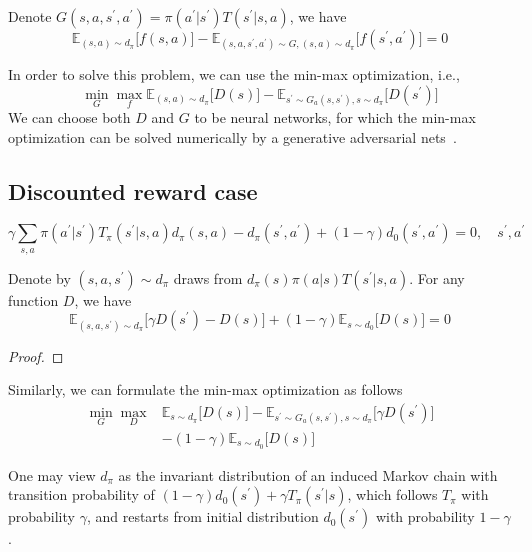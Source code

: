 Denote $G(s, a, s^\prime, a^\prime) = \pi(a^\prime|s^\prime) T(s^\prime|s, a)$, we have
\begin{equation}
\mathbb{E}_{(s,a)\sim d_{\pi}}\big[ f(s,a) \big] - \mathbb{E}_{(s, a, s^\prime, a^\prime) \sim G, (s,a)\sim d_{\pi}}\big[ f(s^\prime, a^\prime) \big] = 0
\end{equation}

In order to solve this problem, we can use the min-max optimization, i.e., 
\begin{equation}
\min_{G} \max_{f} \mathbb{E}_{(s,a)\sim d_{\pi}}\big[ D(s) \big] - \mathbb{E}_{s^\prime \sim G_a(s, s^\prime), s\sim d_{\pi}}\big[ D(s^\prime) \big]
\end{equation}
We can choose both $D$ and $G$ to be neural networks, for which the min-max optimization can be solved numerically by a generative adversarial nets~\cite{goodfellow2014generative}. 


\subsection{Discounted reward case}
\begin{equation}
\gamma \sum_{s, a}\pi(a^\prime|s^\prime) T_{\pi}(s^\prime |s, a) d_{\pi}(s, a) - d_{\pi}(s^\prime, a^\prime) + (1-\gamma)d_0(s^\prime, a^\prime) = 0, \quad s^\prime, a^\prime
\end{equation}

\begin{lemma}
\cite{liu2018breaking} Denote by $(s, a, s^\prime)\sim d_{\pi}$ draws from $d_{\pi}(s)\pi(a|s)T(s^\prime|s, a)$. For any function $D$, we have
\begin{equation}
\mathbb{E}_{(s,a,s^\prime)\sim d_{\pi}} \big[ \gamma D(s^\prime) - D(s) \big] + (1-\gamma) \mathbb{E}_{s\sim d_0}\big[ D(s) \big] = 0
\end{equation}
\end{lemma}

\begin{proof}

\end{proof}

Similarly, we can formulate the min-max optimization as follows
\begin{align}
\min_{G}\max_{D} & \mathbb{E}_{s\sim d_{\pi}} \big[ D(s) \big] - \mathbb{E}_{s^\prime\sim G_a(s, s^\prime), s\sim d_{\pi}} \big[ \gamma D(s^\prime) \big] \nonumber\\
& - (1-\gamma) \mathbb{E}_{s\sim d_0}\big[ D(s) \big]
\end{align}

One may view $d_{\pi}$ as the invariant distribution of an induced Markov chain with transition probability of $(1-\gamma) d_{0}(s^\prime) + \gamma T_{\pi}(s^\prime|s)$, which follows $T_{\pi}$ with probability $\gamma$, and restarts from initial distribution $d_{0}(s^\prime)$ with probability $1-\gamma$. 
